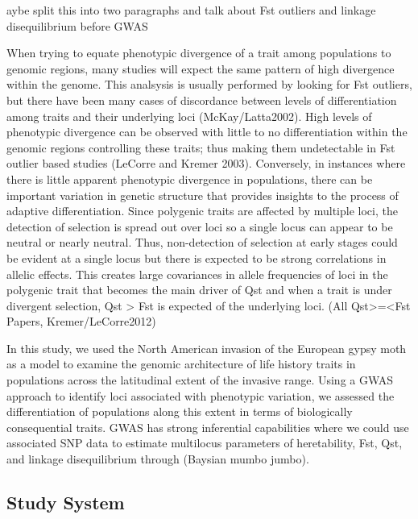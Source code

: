 \documentclass[fleqn,11pt]{wlpeerj}
\begin{document}
^^Maybe split this into two paragraphs and talk about Fst outliers and linkage disequilibrium before GWAS

When trying to equate phenotypic divergence of a trait among populations to genomic regions, many studies will expect the same pattern of high divergence within the genome. This analsysis is usually performed by looking for Fst outliers, but there have been many cases of discordance between levels of differentiation among traits and their underlying loci (McKay/Latta2002).  High levels of phenotypic divergence can be observed with little to no differentiation within the genomic regions controlling these traits; thus making them undetectable in Fst outlier based studies (LeCorre and Kremer 2003).  Conversely, in instances where there is little apparent phenotypic divergence in populations, there can be important variation in genetic structure that provides insights to the process of adaptive differentiation. Since polygenic traits are affected by multiple loci, the detection of selection is spread out over loci so a single locus can appear to be neutral or nearly neutral. Thus, non-detection of selection at early stages could be evident at a single locus but there is expected to be strong correlations in allelic effects. This creates large covariances in allele frequencies of loci in the polygenic trait that becomes the main driver of Qst and when a trait is under divergent selection, Qst > Fst is expected of the underlying loci. (All Qst>=<Fst Papers, Kremer/LeCorre2012)

In this study, we used the North American invasion of the European gypsy moth as a model to examine the genomic architecture of life history traits in populations across the latitudinal extent of the invasive range.  Using a GWAS approach to identify loci associated with phenotypic variation, we assessed the differentiation of populations along this extent in terms of biologically consequential traits. GWAS has strong inferential capabilities where we could use associated SNP data to estimate multilocus parameters of heretability, Fst, Qst, and linkage disequilibrium through (Baysian mumbo jumbo).

\subsection*{Study System}
\end{document}

